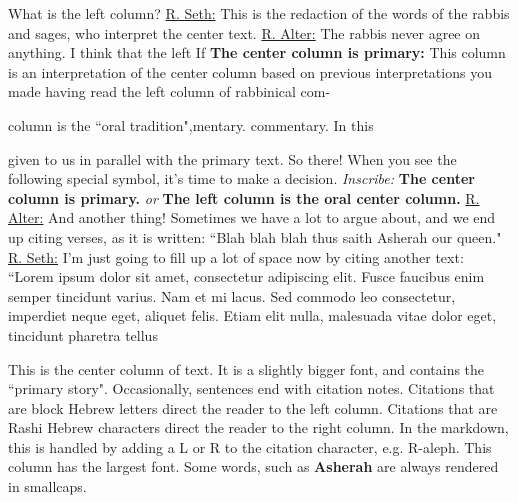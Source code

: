 \documentclass[11pt,letterpaper,openany]{scrbook}
\newcommand{\leftcitation}[1]{\leftcitationfont{\Large\textcolor{hcolor}{#1}}}
\newcommand{\rightcitation}[1]{\rightcitationfont{\normalsize\textcolor{hcolor}{#1}}}
\begin{document}
\begin{sloppypar}
\begin{paracol}{2}

\fontsize{11}{13}\leftfont  \leftcitation{א} \leftfont What is the left column? \underline{R. Seth:} This is the redaction of the words of the rabbis and sages, who interpret the center text. \underline{R. Alter:} The rabbis never agree on anything. I think that the left\switchcolumn\fontsize{11}{13}\rightfont  \rightcitation{א} \rightfont If \textbf{The center column is primary:}  This column is an interpretation of the center column based on previous interpretations you made having read the left column of rabbinical com-

\end{paracol}


\begin{paracol}{3}

\fontsize{11}{13}\leftfont column is the ``oral tradition",\switchcolumn[2]\fontsize{11}{13}\rightfont mentary. commentary. In this

\end{paracol}

\begin{paracol}{3}\fontsize{11}{13}\leftfont given to us in parallel with the primary text. So there! When you see the following special symbol, it's time to make a decision.  \leftfont \textit{Inscribe:} \textbf{The center column is primary.} \textit{or} \textbf{The left column is the oral center column.}  \leftcitation{ב} \leftfont \underline{R. Alter:}  And another thing! Sometimes we have a lot to argue about, and we end up citing verses, as it is written: ``Blah blah blah thus saith Asherah our queen." \underline{R. Seth:} I'm just going to fill up a lot of space now by citing another text: ``Lorem ipsum dolor sit amet, consectetur adipiscing elit. Fusce faucibus enim semper tincidunt varius. Nam et mi lacus. Sed commodo leo consectetur, imperdiet neque eget, aliquet felis. Etiam elit nulla, malesuada vitae dolor eget, tincidunt pharetra tellus

\switchcolumn

\fontsize{13}{15}\centerfont This is the center column of text. It is a slightly bigger font, and contains the ``primary story". Occasionally, sentences end with citation notes. \leftcitationfont{\leftcitation א} \centerfont  Citations that are block Hebrew letters direct the reader to the left column. \leftcitationfont{\leftcitation ב} \centerfont  Citations that are Rashi Hebrew characters direct the reader to the right column. \rightcitationfont{\rightcitation א} \centerfont In the markdown, this is handled by adding a L or R to the citation character, e.g. R-aleph. \rightcitationfont{\rightcitation ב} \centerfont  This column has the largest font. Some words, such as \textbf{Asherah} are always rendered in smallcaps.


\end{paracol}
\end{sloppypar}
\end{document}
